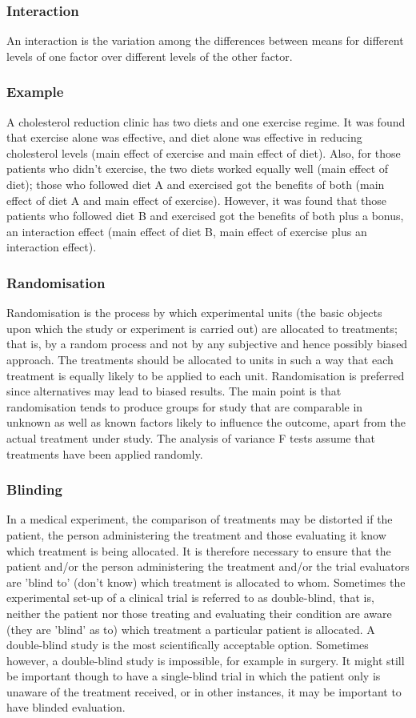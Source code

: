 \subsubsection*{Interaction}
An interaction is the variation among the differences between means for different levels of one factor over different levels of the other factor.
\subsubsection*{Example}
A cholesterol reduction clinic has two diets and one exercise regime. It was found that exercise alone was effective, and diet alone was effective in reducing cholesterol levels (main effect of exercise and main effect of diet). Also, for those patients who didn't exercise, the two diets worked equally well (main effect of diet); those who followed diet A and exercised got the benefits of both (main effect of diet A and main effect of exercise). However, it was found that those patients who followed diet B and exercised got the benefits of both plus a bonus, an interaction effect (main effect of diet B, main effect of exercise plus an interaction effect).
\subsubsection*{Randomisation}
Randomisation is the process by which experimental units (the basic objects upon which the study or experiment is carried out) are allocated to treatments; that is, by a random process and not by any subjective and hence possibly biased approach. The treatments should be allocated to units in such a way that each treatment is equally likely to be applied to each unit.
Randomisation is preferred since alternatives may lead to biased results.
The main point is that randomisation tends to produce groups for study that are comparable in unknown as well as known factors likely to influence the outcome, apart from the actual treatment under study. The analysis of variance F tests assume that treatments have been applied randomly.
\subsubsection*{Blinding}
In a medical experiment, the comparison of treatments may be distorted if the patient, the person administering the treatment and those evaluating it know which treatment is being allocated. It is therefore necessary to ensure that the patient and/or the person administering the treatment and/or the trial evaluators are 'blind to' (don't know) which treatment is allocated to whom.
Sometimes the experimental set-up of a clinical trial is referred to as double-blind, that is, neither the patient nor those treating and evaluating their condition are aware (they are 'blind' as to) which treatment a particular patient is allocated. A double-blind study is the most scientifically acceptable option.
Sometimes however, a double-blind study is impossible, for example in surgery. It might still be important though to have a single-blind trial in which the patient only is unaware of the treatment received, or in other instances, it may be important to have blinded evaluation.
